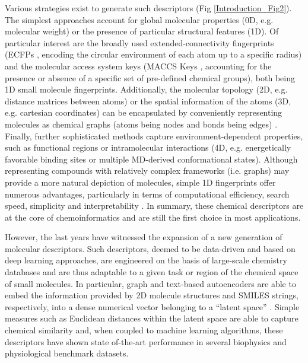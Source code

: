 Various strategies exist to generate such descriptors (Fig \ref{Introduction_Fig2}). The simplest approaches account for global molecular properties (0D, e.g. molecular weight) or the presence of particular structural features (1D). Of particular interest are the broadly used extended-connectivity fingerprints (ECFPs \cite{rogers_extended-connectivity_2010}, encoding the circular environment of each atom up to a specific radius) and the molecular access system keys (MACCS Keys \cite{durant_reoptimization_2002}, accounting for the presence or absence of a specific set of pre-defined chemical groups), both being 1D small molecule fingerprints. Additionally, the molecular topology (2D, e.g. distance matrices between atoms) or the spatial information of the atoms (3D, e.g. cartesian coordinates) can be encapsulated by conveniently representing molecules as chemical graphs (atoms being nodes and bonds being edges) \cite{devinyak_3d-morse_2014}. Finally, further sophisticated methods capture environment-dependent properties, such as functional regions or intramolecular interactions (4D, e.g. energetically favorable binding sites or multiple MD-derived conformational states)\cite{pastor_grid-independent_2000, riniker_molecular_2017}. Although representing compounds with relatively complex frameworks (i.e. graphs) may provide a more natural depiction of molecules, simple 1D fingerprints offer numerous advantages, particularly in terms of computational efficiency, search speed, simplicity and interpretability \cite{rogers_extended-connectivity_2010}. In summary, these chemical descriptors are at the core of chemoinformatics and are still the first choice in most applications\cite{david_molecular_2020, cereto-massague_molecular_2015}.

However, the last years have witnessed the expansion of a new generation of molecular descriptors. Such descriptors, deemed to be data-driven and based on deep learning approaches, are engineered on the basis of large-scale chemistry databases and are thus adaptable to a given task or region of the chemical space of small molecules\cite{sanchez-lengeling_inverse_2018}. In particular, graph and text-based autoencoders\cite{hinton_reducing_2006, baldi_autoencoders_2012} are able to embed the information provided by 2D molecule structures and SMILES strings, respectively, into a dense numerical vector belonging to a “latent space” \cite{jin_hierarchical_2019, gomez-bombarelli_automatic_2018, liu_constrained_2018, polykovskiy_molecular_2020}. Simple measures such as Euclidean distances within the latent space are able to capture chemical similarity and, when coupled to machine learning algorithms, these descriptors have shown state of-the-art performance in several biophysics and physiological benchmark datasets\cite{wu_moleculenet_2018}.

